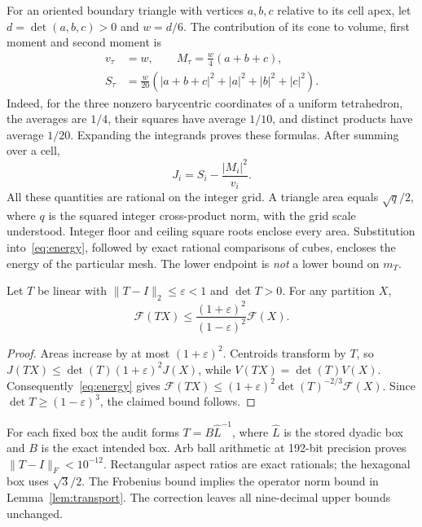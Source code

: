 \documentclass[11pt,a4paper]{report}
\newcommand{\DF}{\mathcal F}
\begin{document}
For an oriented boundary triangle with vertices $a,b,c$ relative to its
cell apex, let $d=\det(a,b,c)>0$ and $w=d/6$. The contribution of its cone
to volume, first moment and second moment is
\begin{align}
 v_\tau&=w,\qquad
 M_\tau=\frac w4(a+b+c),\label{eq:first}\\
 S_\tau&=\frac w{20}\left(|a+b+c|^2+|a|^2+|b|^2+|c|^2\right).
 \label{eq:second}
\end{align}
Indeed, for the three nonzero barycentric coordinates of a uniform
tetrahedron, the averages are $1/4$, their squares have average $1/10$,
and distinct products have average $1/20$. Expanding the integrands proves
these formulas. After summing over a cell,
\[
 J_i=S_i-\frac{|M_i|^2}{v_i}.
\]
All these quantities are rational on the integer grid. A triangle area
equals $\sqrt{q}/2$, where $q$ is the squared integer cross-product norm,
with the grid scale understood. Integer floor and ceiling square roots
enclose every area. Substitution into~\eqref{eq:energy}, followed by exact
rational comparisons of cubes, encloses the energy of the particular mesh.
The lower endpoint is \emph{not} a lower bound on $m_T$.

\begin{lemma}\label{lem:transport}
Let $T$ be linear with $\|T-I\|_2\leq\varepsilon<1$ and $\det T>0$.
For any partition $X$,
\[
 \DF(TX)\leq\frac{(1+\varepsilon)^2}{(1-\varepsilon)^2}\DF(X).
\]
\end{lemma}
\begin{proof}
Areas increase by at most $(1+\varepsilon)^2$. Centroids transform by $T$,
so $J(TX)\leq\det(T)(1+\varepsilon)^2J(X)$, while
$V(TX)=\det(T)V(X)$. Consequently~\eqref{eq:energy} gives
$\DF(TX)\leq(1+\varepsilon)^2\det(T)^{-2/3}\DF(X)$.
Since $\det T\geq(1-\varepsilon)^3$, the claimed bound follows.
\end{proof}

For each fixed box the audit forms $T=B\widehat L^{-1}$, where
$\widehat L$ is the stored dyadic box and $B$ is the exact intended box.
Arb ball arithmetic at 192-bit precision proves
$\|T-I\|_F<10^{-12}$. Rectangular aspect ratios are exact rationals;
the hexagonal box uses $\sqrt3/2$. The Frobenius bound implies the operator
norm bound in Lemma~\ref{lem:transport}. The correction leaves all
nine-decimal upper bounds unchanged.
\end{document}
